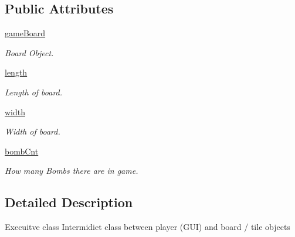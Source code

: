 \subsection*{Public Attributes}
\begin{DoxyCompactItemize}
\item 
\mbox{\label{classexecutive_1_1executive_a2c01f1bb0156618e68f096cc8aad5f9b}} 
\mbox{\hyperlink{classexecutive_1_1executive_a2c01f1bb0156618e68f096cc8aad5f9b}{game\+Board}}
\begin{DoxyCompactList}\small\item\em Board Object. \end{DoxyCompactList}\item 
\mbox{\label{classexecutive_1_1executive_afcb8b34bb0f032c2ffae4573b9a42613}} 
\mbox{\hyperlink{classexecutive_1_1executive_afcb8b34bb0f032c2ffae4573b9a42613}{length}}
\begin{DoxyCompactList}\small\item\em Length of board. \end{DoxyCompactList}\item 
\mbox{\label{classexecutive_1_1executive_a3ffae68509fd1c2b2043198df88b913c}} 
\mbox{\hyperlink{classexecutive_1_1executive_a3ffae68509fd1c2b2043198df88b913c}{width}}
\begin{DoxyCompactList}\small\item\em Width of board. \end{DoxyCompactList}\item 
\mbox{\label{classexecutive_1_1executive_ab749a7a52e7361de73ee03285a25e804}} 
\mbox{\hyperlink{classexecutive_1_1executive_ab749a7a52e7361de73ee03285a25e804}{bomb\+Cnt}}
\begin{DoxyCompactList}\small\item\em How many Bombs there are in game. \end{DoxyCompactList}\end{DoxyCompactItemize}


\subsection{Detailed Description}
\begin{DoxyVerb}Execuitve class
Intermidiet class between player (GUI) and board / tile objects
\end{DoxyVerb}
 

